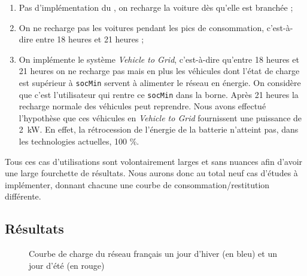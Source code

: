 		\begin{enumerate}
			\item Pas d'implémentation du \smartgrid{}, on recharge la voiture dès qu'elle est branchée ;
			\item On ne recharge pas les voitures pendant les pics de consommation, c'est-à-dire entre 18 heures et 21 heures ;
			\item On implémente le système \emph{Vehicle to Grid}, c'est-à-dire qu'entre 18 heures et 21 heures on ne recharge pas mais en plus les véhicules dont l'état de charge est supérieur à \lstinline{socMin} servent à alimenter le réseau en énergie. On considère que c'est l'utilisateur qui rentre ce \lstinline{socMin} dans la borne.  Après 21 heures la recharge normale des véhicules peut reprendre. Nous avons effectué l'hypothèse que ces véhicules en \emph{Vehicle to Grid} fournissent une puissance de \SI{2}{\kilo\watt}. En effet, la rétrocession de l'énergie de la batterie n'atteint pas, dans les technologies actuelles, 100 \%.
		\end{enumerate}
		
		\bigskip
		
		Tous ces cas d'utilisations sont volontairement larges et sans nuances afin d'avoir une large fourchette de résultats.
		Nous aurons donc au total neuf cas d'études à implémenter, donnant chacune une courbe de consommation/restitution différente. 
		
		
		\subsection{Résultats}
			
			\begin{figure}[!h]
				\centering
				\caption{Courbe de charge du réseau français un jour d'hiver (en bleu) et un jour d'été (en rouge)}
			\end{figure}
			
